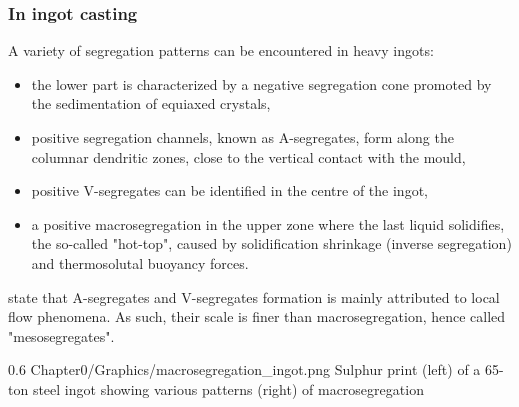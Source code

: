\subsubsection*{In ingot casting}
A variety of segregation patterns can be encountered in heavy ingots: 
\begin{itemize}
\itemsep0em 
\item the lower part is characterized by a negative segregation cone promoted by the sedimentation of 
	  equiaxed crystals,
\item positive segregation channels, known as A-segregates, form along the columnar dendritic zones, close to the vertical contact with the mould,
\item positive V-segregates can be identified in the centre of the ingot,
\item a positive macrosegregation in the upper zone where the last liquid solidifies, the so-called "hot-top", caused by solidification shrinkage (inverse segregation)
	  and thermosolutal buoyancy forces. 
\end{itemize}
\citet{combeau_prediction_2009} state that A-segregates and V-segregates formation is mainly attributed to local flow phenomena.
As such, their scale is finer than macrosegregation, hence called "mesosegregates".
\begin{figureth}
{0.6}
{Chapter0/Graphics/macrosegregation_ingot.png}
{Sulphur print (left) of a 65-ton steel ingot \citep{lesoult_macrosegregation_2005} showing various patterns (right) of macrosegregation \citep{flemings_solidification_1974}}
\label{macrosegregation_ingot}
\end{figureth}
%
%
